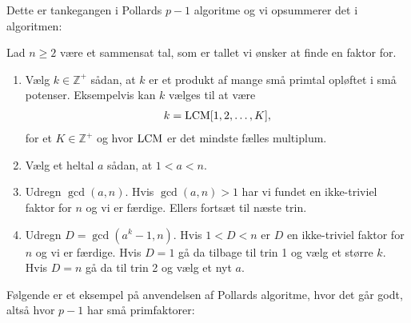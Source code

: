 Dette er tankegangen i Pollards $p-1$ algoritme og vi opsummerer det i algoritmen:

\begin{algorithm}
Lad $n \geq 2$ være et sammensat tal, som er tallet vi ønsker at 
finde en faktor for.
\begin{enumerate}
	\item Vælg $k \in \mathbb{Z}^+$ sådan, at $k$ er et produkt
	af mange små primtal opløftet i små potenser. Eksempelvis kan $k$ vælges til at være
	\begin{align*}
		k = \mathrm{LCM} [1, 2, \ldots, K],
	\end{align*}
	for et $K \in \mathbb{Z}^+$ og hvor $\mathrm{LCM}$ er det mindste fælles multiplum.
	\item Vælg et heltal $a$ sådan, at $1 < a <n$.
	\item Udregn $\gcd(a, n)$. Hvis $\gcd(a, n) > 1$ har vi fundet en
	ikke-triviel faktor for $n$ og vi er færdige. Ellers fortsæt til næste
	trin.
	\item Udregn $D = \gcd(a^k - 1, n)$. Hvis $1 < D < n$ er $D$ en ikke-triviel
	faktor for $n$ og vi er færdige. Hvis $D = 1$ gå da tilbage til trin 1
	og vælg et større $k$. Hvis $D = n$ gå da til trin 2 og vælg et nyt $a$. 
\end{enumerate}
\end{algorithm}

Følgende er et eksempel på anvendelsen af Pollards algoritme,
hvor det går godt, altså hvor $p-1$ har små primfaktorer:

